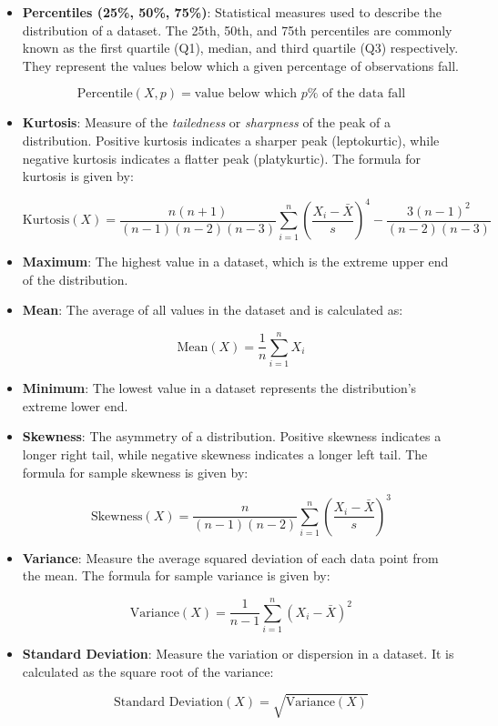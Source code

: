 \begin{itemize}
    \item \textbf{Percentiles (25\%, 50\%, 75\%)}: Statistical measures used to describe the distribution of a dataset. The 25th, 50th, and 75th percentiles are commonly known as the first quartile (Q1), median, and third quartile (Q3) respectively. They represent the values below which a given percentage of observations fall.

\[
\text{{Percentile}}(X, p) = \text{{value below which }} p\% \text{{ of the data fall}}
\]

    \item \textbf{Kurtosis}: Measure of the \textit{tailedness} or \textit{sharpness} of the peak of a distribution. Positive kurtosis indicates a sharper peak (leptokurtic), while negative kurtosis indicates a flatter peak (platykurtic). The formula for kurtosis is given by:

\[
\text{{Kurtosis}}(X) = \frac{n(n+1)}{(n-1)(n-2)(n-3)} \sum_{i=1}^{n} \left(\frac{X_i - \bar{X}}{s}\right)^4 - \frac{3(n-1)^2}{(n-2)(n-3)}
\]

    \item \textbf{Maximum}: The highest value in a dataset, which is the extreme upper end of the distribution.

    \item \textbf{Mean}: The average of all values in the dataset and is calculated as:

\[
\text{{Mean}}(X) = \frac{1}{n} \sum_{i=1}^{n} X_i
\]

    \item \textbf{Minimum}: The lowest value in a dataset represents the distribution's extreme lower end.

    \item \textbf{Skewness}: The asymmetry of a distribution. Positive skewness indicates a longer right tail, while negative skewness indicates a longer left tail. The formula for sample skewness is given by:

\[
\text{{Skewness}}(X) = \frac{n}{(n-1)(n-2)} \sum_{i=1}^{n} \left(\frac{X_i - \bar{X}}{s}\right)^3
\]

    \item \textbf{Variance}: Measure the average squared deviation of each data point from the mean. The formula for sample variance is given by:

\[
\text{{Variance}}(X) = \frac{1}{n-1} \sum_{i=1}^{n} (X_i - \bar{X})^2
\]

    \item \textbf{Standard Deviation}: Measure the variation or dispersion in a dataset. It is calculated as the square root of the variance:

\[
\text{{Standard Deviation}}(X) = \sqrt{\text{{Variance}}(X)}
\]


\end{itemize}

